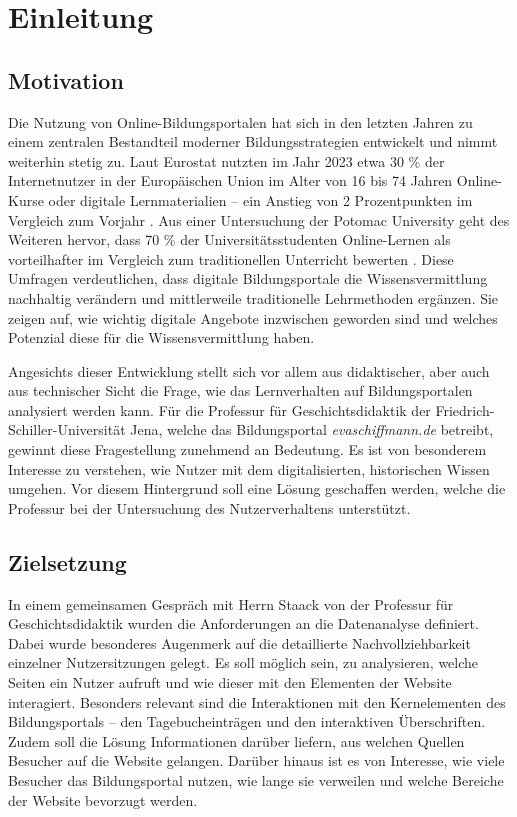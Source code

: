 \chapter{Einleitung}
\label{ch:einleitung}

\section{Motivation}
\label{sec:motivation}

Die Nutzung von Online-Bildungsportalen hat sich in den letzten Jahren zu einem zentralen Bestandteil moderner Bildungsstrategien entwickelt und nimmt weiterhin stetig zu. Laut Eurostat nutzten im Jahr 2023 etwa 30 \% der Internetnutzer in der Europäischen Union im Alter von 16 bis 74 Jahren Online-Kurse oder digitale Lernmaterialien – ein Anstieg von 2 Prozentpunkten im Vergleich zum Vorjahr \parencite{Eurostat}. Aus einer Untersuchung der Potomac University geht des Weiteren hervor, dass 70 \% der Universitätsstudenten Online-Lernen als vorteilhafter im Vergleich zum traditionellen Unterricht bewerten \parencite{Potomac}. Diese Umfragen verdeutlichen, dass digitale Bildungsportale die Wissensvermittlung nachhaltig verändern und mittlerweile traditionelle Lehrmethoden ergänzen. Sie zeigen auf, wie wichtig digitale Angebote inzwischen geworden sind und welches Potenzial diese für die Wissensvermittlung haben.

Angesichts dieser Entwicklung stellt sich vor allem aus didaktischer, aber auch aus technischer Sicht die Frage, wie das Lernverhalten auf Bildungsportalen analysiert werden kann. Für die Professur für Geschichtsdidaktik der Friedrich-Schiller-Universität Jena, welche das Bildungsportal \textit{evaschiffmann.de} betreibt, gewinnt diese Fragestellung zunehmend an Bedeutung. Es ist von besonderem Interesse zu verstehen, wie Nutzer mit dem digitalisierten, historischen Wissen umgehen. Vor diesem Hintergrund soll eine Lösung geschaffen werden, welche die Professur bei der Untersuchung des Nutzerverhaltens unterstützt.

\section{Zielsetzung}
\label{sec:zielsetzung}

In einem gemeinsamen Gespräch mit Herrn Staack von der Professur für Geschichtsdidaktik wurden die Anforderungen an die Datenanalyse definiert. Dabei wurde besonderes Augenmerk auf die detaillierte Nachvollziehbarkeit einzelner Nutzersitzungen gelegt. Es soll möglich sein, zu analysieren, welche Seiten ein Nutzer aufruft und wie dieser mit den Elementen der Website interagiert. Besonders relevant sind die Interaktionen mit den Kernelementen des Bildungsportals – den Tagebucheinträgen und den interaktiven Überschriften. Zudem soll die Lösung Informationen darüber liefern, aus welchen Quellen Besucher auf die Website gelangen. Darüber hinaus ist es von Interesse, wie viele Besucher das Bildungsportal nutzen, wie lange sie verweilen und welche Bereiche der Website bevorzugt werden.

